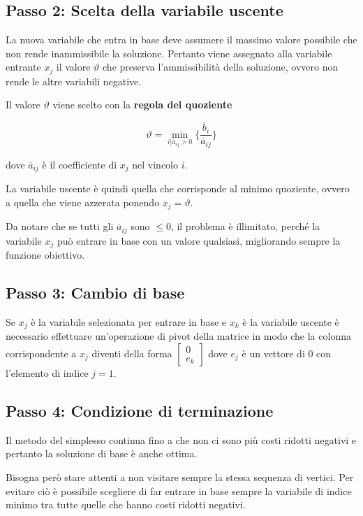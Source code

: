\subsection{Passo 2: Scelta della variabile uscente}

La nuova variabile che entra in base deve assumere il massimo valore possibile che non rende inammissibile la soluzione.
Pertanto viene assegnato alla variabile entrante $x_j$ il valore $\vartheta$ che preserva l'ammissibilità della soluzione, ovvero non rende le altre variabili negative.

Il valore $\vartheta$ viene scelto con la \textbf{regola del quoziente}

$$
\vartheta = \min\limits_{i | \overline{a}_{ij} > 0} \bigg\{ \frac{\overline{b}_i}{\overline{a}_{ij}} \bigg\}
$$

dove $\overline{a}_{ij}$ è il coefficiente di $x_j$ nel vincolo $i$.

La variabile uscente è quindi quella che corrisponde al minimo quoziente, ovvero a quella che viene azzerata ponendo $x_j = \vartheta$.

Da notare che se tutti gli $\overline{a}_{ij}$ sono $\leq 0$, il problema è illimitato, perché la variabile $x_j$ può entrare in base con un valore qualsiasi, migliorando sempre la funzione obiettivo.

\subsection{Passo 3: Cambio di base} 

Se $x_j$ è la variabile selezionata per entrare in base e $x_k$ è la variabile uscente è necessario effettuare un'operazione di pivot della matrice in modo che la colonna corrispondente a $x_j$ diventi della forma $ \begin{bmatrix}
0\\ 
e_k
\end{bmatrix} $ dove $e_j$ è un vettore di 0 con l'elemento di indice $j = 1$.

\subsection{Passo 4: Condizione di terminazione}

Il metodo del simplesso continua fino a che non ci sono più costi ridotti negativi e pertanto la soluzione di base è anche ottima.

Bisogna però stare attenti a non visitare sempre la stessa sequenza di vertici. Per evitare ciò è possibile scegliere di far entrare in base sempre la variabile di indice minimo tra tutte quelle che hanno costi ridotti negativi.



